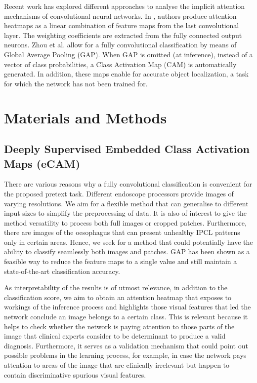 \documentclass[runningheads]{llncs}
\begin{document}
Recent work has explored different approaches to analyse the implicit attention mechanisms of convolutional neural networks. In \cite{Given2013}, authors produce attention heatmaps as a linear combination of feature maps from the last convolutional layer. The weighting coefficients are extracted from the fully connected output neurons. Zhou et al. \cite{Zhou2015} allow for a fully convolutional classification by means of Global Average Pooling (GAP). When GAP is omitted (at inference), instead of a vector of class probabilities, a Class Activation Map (CAM) is automatically generated. In addition, these maps enable for accurate object localization, a task for which the network has not been trained for. %

\section{Materials and Methods}

\subsection{Deeply Supervised Embedded Class Activation Maps (eCAM)}

There are various reasons why a fully convolutional classification is convenient for the proposed pretext task. Different endoscope processors provide images of varying resolutions. We aim for a flexible method that can generalise to different input sizes to simplify the preprocessing of data. It is also of interest to give the method versatility to process both full images or cropped patches. Furthermore, there are images of the oesophagus that can present unhealthy IPCL patterns only in certain areas. Hence, we seek for a method that could potentially have the ability to classify seamlessly both images and patches. GAP \cite{Zhou2015} has been shown as a feasible way to reduce the feature maps to a single value and still maintain a state-of-the-art classification accuracy.

As interpretability of the results is of utmost relevance, in addition to the classification score, we aim to obtain an attention heatmap that exposes to workings of the inference process and highlights those visual features that led the network conclude an image belongs to a certain class. This is relevant because it helps to check whether the network is paying attention to those parts of the image that clinical experts consider to be determinant to produce a valid diagnosis. Furthermore, it serves as a validation mechanism that could point out possible problems in the learning process, for example, in case the network pays attention to areas of the image that are clinically irrelevant but happen to contain discriminative spurious visual features. 
\end{document}
